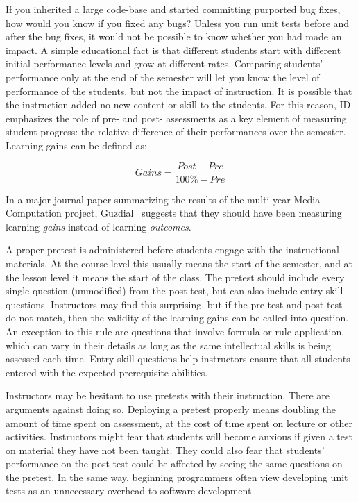 If you inherited a large code-base and started committing purported bug fixes, how would you know if you fixed any bugs?
Unless you run unit tests before and after the bug fixes, it would not be possible to know whether you had made an impact.
A simple educational fact is that different students start with different initial performance levels and grow at different rates.
Comparing students' performance only at the end of the semester will let you know the level of performance of the students, but not the impact of instruction.
It is possible that the instruction added no new content or skill to the students.
For this reason, ID emphasizes the role of pre- and post- assessments as a key element of measuring student progress: the relative difference of their performances over the semester.
Learning gains can be defined as:

\[
Gains = \frac{Post - Pre}{100\% - Pre}
\]

In a major journal paper summarizing the results of the multi-year Media Computation project, Guzdial~\cite{??} suggests that they should have been measuring learning \textit{gains} instead of learning \textit{outcomes}.


A proper pretest is administered before students engage with the instructional materials.
At the course level this usually means the start of the semester, and at the lesson level it means the start of the class.
The pretest should include every single question (unmodified) from the post-test, but can also include entry skill questions.
Instructors may find this surprising, but if the pre-test and post-test do not match, then the validity of the learning gains can be called into question.
An exception to this rule are questions that involve formula or rule application, which can vary in their details as long as the same intellectual skills is being assessed each time.
Entry skill questions help instructors ensure that all students entered with the expected prerequisite abilities.

Instructors may be hesitant to use pretests with their instruction.
There are arguments against doing so.
Deploying a pretest properly means doubling the amount of time spent on assessment, at the cost of time spent on lecture or other activities.
Instructors might fear that students will become anxious if given a test on material they have not been taught.
They could also fear that students' performance on the post-test could be affected by seeing the same questions on the pretest.
In the same way, beginning programmers often view developing unit tests as an unnecessary overhead to software development.

